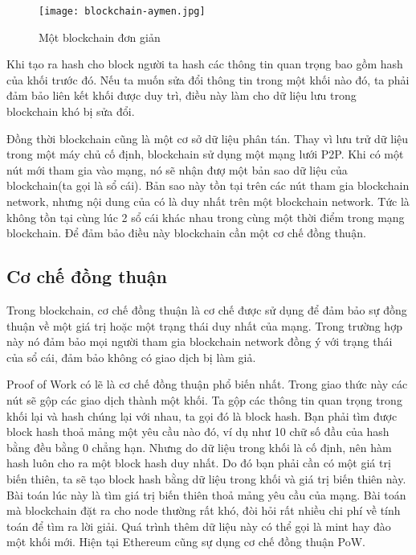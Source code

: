 \documentclass[../thesis.tex]{subfiles}
\begin{document}
\begin{figure}[ht]
   \centering
   \texttt{[image: blockchain-aymen.jpg]}
   \caption{Một blockchain đơn giản}
\end{figure}

Khi tạo ra hash cho block người ta hash các thông tin quan trọng bao gồm hash của khối trước đó. Nếu ta muốn sửa đổi thông tin trong một khối nào đó, ta phải đảm bảo liên kết khối được duy trì, điều này làm cho dữ liệu lưu trong blockchain khó bị sửa đổi. 

Đồng thời blockchain cũng là một cơ sở dữ liệu phân tán. Thay vì lưu trử dữ liệu trong một máy chủ cố định, blockchain sử dụng một mạng lưới P2P. Khi có một nút mới tham gia vào mạng, nó sẽ nhận đượ một bản sao dữ liệu của blockchain(ta gọi là sổ cái). Bản sao này tồn tại trên các nút tham gia blockchain network, nhưng nội dung của có là duy nhất trên một blockchain network. Tức là không tồn tại cùng lúc 2 sổ cái khác nhau trong cùng một thời điểm trong mạng blockchain. Để đảm bảo điều này blockchain cần một cơ chế đồng thuận.

\subsection{Cơ chế đồng thuận}
Trong blockchain, cơ chế đồng thuận là cơ chế được sử dụng để đảm bảo sự đồng thuận về một giá trị hoặc một trạng thái duy nhất của mạng. Trong trường hợp này nó đảm bảo mọi người tham gia blockchain network đồng ý với trạng thái của sổ cái, đảm bảo không có giao dịch bị làm giả.

Proof of Work có lẽ là cơ chế đồng thuận phổ biến nhất. Trong giao thức này các nút sẽ gộp các giao dịch thành một khối. Ta gộp các thông tin quan trọng trong khối lại và hash chúng lại với nhau, ta gọi đó là block hash. Bạn phải tìm được block hash thoả mảng một yêu cầu nào đó, ví dụ như 10 chữ số đầu của hash bằng đều bằng 0 chẳng hạn. Nhưng do dữ liệu trong khối là cố định, nên hàm hash luôn cho ra một block hash duy nhất. Do đó bạn phải cần có một giá trị biến thiên, ta sẽ tạo block hash bằng dữ liệu trong khối và giá trị biến thiên này. Bài toán lúc này là tìm giá trị biến thiên thoả mảng yêu cầu của mạng. Bài toán mà blockchain đặt ra cho node thường rất khó, đòi hỏi rất nhiều chi phí về tính toán để tìm ra lời giải. Quá trình thêm dữ liệu này có thể gọi là mint hay đào một khối mới. Hiện tại Ethereum cũng sự dụng cơ chế đồng thuận PoW.
\end{document}
